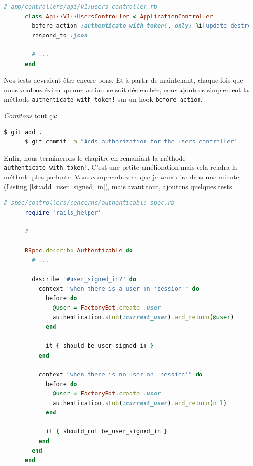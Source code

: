 \documentclass[]{report}
\begin{document}
    \begin{scriptsize}
      \begin{lstlisting}[language=ruby, caption={Utilisation de la méthode before\_action pour le controlleur des utilisateurs}, label={lst:add_before_action_to_users}]
      # app/controllers/api/v1/users_controller.rb
      class Api::V1::UsersController < ApplicationController
        before_action :authenticate_with_token!, only: %i[update destroy]
        respond_to :json

        # ...
      end
      \end{lstlisting}
    \end{scriptsize}

    Nos tests devraient être encore bons. Et à partir de maintenant, chaque fois que nous voulons éviter qu'une action ne soit déclenchée, nous ajoutons simplement la méthode \verb|authenticate_with_token!| sur un hook \verb|before_action|.

    \textit{Comitons} tout ça:

    \begin{scriptsize}
      \begin{lstlisting}[language=bash]
      $ git add .
      $ git commit -m "Adds authorization for the users controller"
      \end{lstlisting}
    \end{scriptsize}

    Enfin, nous terminerons le chapitre en remaniant la méthode \verb|authenticate_with_token!|, C'est une petite amélioration mais cela rendra la méthode plus parlante. Vous comprendrez ce que je veux dire dans une minute (Listing \ref{lst:add_user_signed_in}), mais avant tout, ajoutons quelques tests.

    \begin{scriptsize}
      \begin{lstlisting}[language=ruby, caption={Création du test user\_signed\_in?}, label={lst:add_user_signed_in_test}]
      # spec/controllers/concerns/authenticable_spec.rb
      require 'rails_helper'

      # ...

      RSpec.describe Authenticable do
        # ...

        describe '#user_signed_in?' do
          context "when there is a user on 'session'" do
            before do
              @user = FactoryBot.create :user
              authentication.stub(:current_user).and_return(@user)
            end

            it { should be_user_signed_in }
          end

          context "when there is no user on 'session'" do
            before do
              @user = FactoryBot.create :user
              authentication.stub(:current_user).and_return(nil)
            end

            it { should_not be_user_signed_in }
          end
        end
      end
      \end{lstlisting}
    \end{scriptsize}
\end{document}
